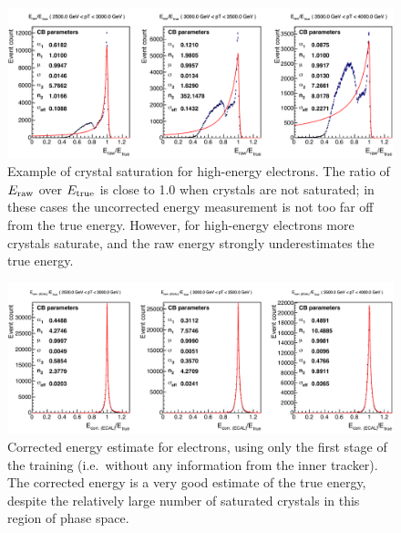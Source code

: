 \begin{figure}[hbtp]
  \begin{center}
    \includegraphics[width=0.99\linewidth]{img/regression/saturation.pdf}
    \caption{
        Example of crystal saturation for high-energy electrons.
        The ratio of $E_\text{raw}$ over $E_\text{true}$ is close to 1.0 when crystals are not saturated; in these cases the uncorrected energy measurement is not too far off from the true energy.
        However, for high-energy electrons more crystals saturate, and the raw energy strongly underestimates the true energy.
        }
    \label{fig:saturation}
  \end{center}
\end{figure}

\begin{figure}[hbtp]
  \begin{center}
    \includegraphics[width=0.99\linewidth]{img/regression/saturation_corrected.pdf}
    \caption{
        Corrected energy estimate for electrons, using only the first stage of the training (i.e.\ without any information from the inner tracker).
        The corrected energy is a very good estimate of the true energy, despite the relatively large number of saturated crystals in this region of phase space.
        }
    \label{fig:saturation_corrected}
  \end{center}
\end{figure}


